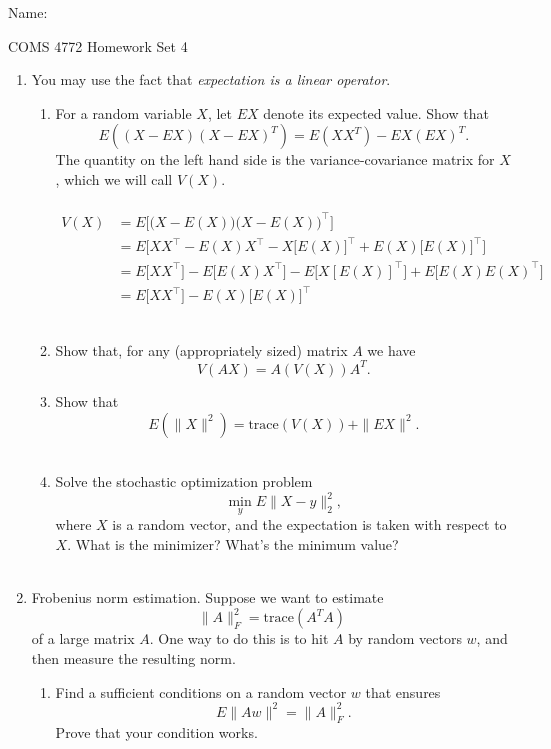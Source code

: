 \documentclass[12pt]{amsart}
\begin{document}
{\Large Name:}  \\
\begin{center}
\Large COMS 4772 \hskip 2in Homework Set 4
\end{center}
\bigskip



\noindent

\begin{enumerate}

\item You may use the fact that {\it expectation is a linear operator}.  
\begin{enumerate}
\item For a random variable $X$, let $EX$ denote its expected value. Show that 
\[
E\left((X-EX)(X-EX)^T\right) = E(XX^T) - EX(EX)^T.
\]
The quantity on the left hand side is the variance-covariance matrix for $X$, which we will call $V(X)$.\\ \\

\begin{align*}
V(X) &= E\bigg[ \Big(X - E(X) \Big) \Big(X-E(X) \Big)^\top \bigg] \\
	&= E\bigg[XX^\top - E(X)X^\top - X \big[E(X)\big]^\top + E(X) \big[E(X)\big]^\top \bigg] \\
	&= E \big[ XX^\top \big] - E \big[ E(X) X^\top \big] - E \big[X [E(X)]^\top \big] + E \big [ E(X) E(X)^\top \big ] \\
	&= E \big[X X^\top \big] - E(X) \big[ E(X) \big]^\top
\end{align*} \\


\item Show that, for any (appropriately sized) matrix $A$ we have
\[
V(AX) = A(V(X))A^T.
\]

\item Show that 
\[
E(\|X\|^2) = \mbox{trace}(V(X))  + \|EX\|^2.
\]
\null\\

\item Solve the stochastic optimization problem 
\[
\min_y E\|X - y\|_2^2,
\]
where $X$ is a random vector, and the expectation is taken with respect to $X$.
What is the minimizer? What's the minimum value? \\\\

\end{enumerate}

\item Frobenius norm estimation. Suppose we want to estimate 
\[
\|A\|_F^2 = \mbox{trace}(A^TA)
\]
of a large matrix $A$. One way to do this is to hit $A$ by random vectors $w$, and then measure 
the resulting norm. 
\begin{enumerate}
\item Find a sufficient conditions on a random vector $w$  that ensures 
\[
E \|Aw\|^2 = \|A\|_F^2.
\]
Prove that your condition works. \\


\end{enumerate}
\end{enumerate}
\end{document}
